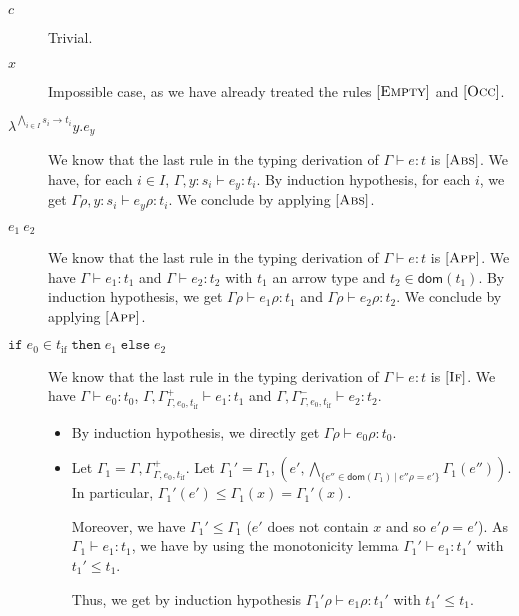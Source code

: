 \documentclass[a4paper]{article}%
\newcommand{\dom}[1]{\textsf{dom}(#1)}
\newcommand{\alt}{~|~}
\newcommand{\ite}[4]{\ensuremath{\texttt{if}\;#1\in#2\;\texttt{then}\;#3\;\texttt{else}\;#4}}
\theoremstyle{definition}
\newcommand {\Rule}[1] {[\textsc{#1}]}
\begin{document}
    \begin{description}
      \item[$c$] Trivial.
      \item[$x$] Impossible case, as we have already treated the rules $\Rule{Empty}$ and $\Rule{Occ}$.
      \item[$\lambda^{\bigwedge_{i\in I} s_i \rightarrow t_i}y.e_y$]
      We know that the last rule in the typing derivation of $\Gamma \vdash e:t$ is $\Rule {Abs}$.
      We have, for each $i \in I$, $\Gamma,y:s_i \vdash e_y:t_i$.
      By induction hypothesis, for each $i$, we get  $\Gamma\rho,y:s_i \vdash e_y\rho:t_i$. We conclude by applying $\Rule {Abs}$.
      \item[$e_1\ e_2$] We know that the last rule in the typing derivation of $\Gamma \vdash e:t$ is $\Rule {App}$.
      We have $\Gamma\vdash e_1:t_1$ and $\Gamma\vdash e_2:t_2$ with $t_1$ an arrow type and $t_2 \in \dom {t_1}$.
      By induction hypothesis, we get $\Gamma\rho\vdash e_1\rho:t_1$ and $\Gamma\rho\vdash e_2\rho:t_2$. We conclude by applying $\Rule {App}$.
      \item[$\ite {e_0} {t_{\text{if}}} {e_1}{e_2}$] We know that the last rule in the typing derivation of $\Gamma \vdash e:t$ is $\Rule {If}$.
      We have $\Gamma\vdash e_0:t_0$, $\Gamma,\Gamma^+_{\Gamma,e_0,t_{\text{if}}}\vdash e_1 : t_1$ and $\Gamma,\Gamma^-_{\Gamma,e_0,t_{\text{if}}}\vdash e_2 : t_2$.
      \begin{itemize}
        \item By induction hypothesis, we directly get $\Gamma\rho\vdash e_0\rho:t_0$.
        \item Let $\Gamma_1 = \Gamma,\Gamma^+_{\Gamma,e_0,t_{\text{if}}}$. Let $\Gamma_1'=\Gamma_1,(e',\bigwedge_{\{e''\in \dom {\Gamma_1}\alt e''\rho=e'\}} \Gamma_1(e''))$.
        In particular, $\Gamma_1'(e')\leq\Gamma_1(x)=\Gamma_1'(x)$.
        
        Moreover, we have $\Gamma_1' \leq \Gamma_1$ ($e'$ does not contain $x$ and so $e'\rho=e'$).
        As $\Gamma_1 \vdash e_1:t_1$, we have by using the monotonicity lemma $\Gamma_1' \vdash e_1:t_1'$ with $t_1'\leq t_1$.

        Thus, we get by induction hypothesis $\Gamma_1'\rho\vdash e_1\rho:t_1'$ with $t_1' \leq t_1$.


\end{itemize}
\end{description}
\end{document}
